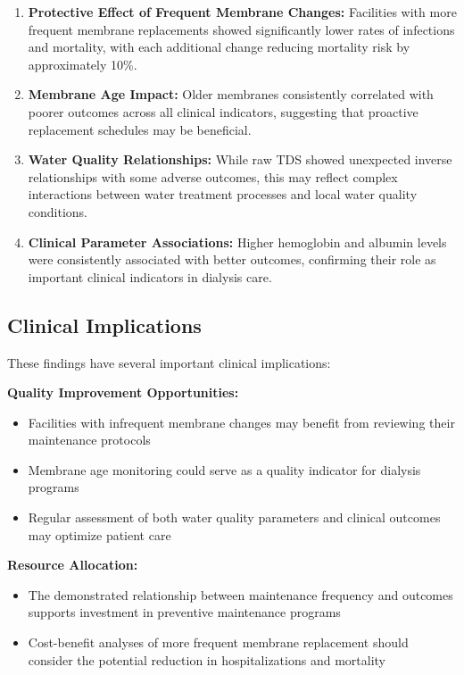 \documentclass[11pt,a4paper]{article}
\begin{document}
\begin{enumerate}
    \item \textbf{Protective Effect of Frequent Membrane Changes:} Facilities with more frequent membrane replacements showed significantly lower rates of infections and mortality, with each additional change reducing mortality risk by approximately 10\%.
    
    \item \textbf{Membrane Age Impact:} Older membranes consistently correlated with poorer outcomes across all clinical indicators, suggesting that proactive replacement schedules may be beneficial.
    
    \item \textbf{Water Quality Relationships:} While raw TDS showed unexpected inverse relationships with some adverse outcomes, this may reflect complex interactions between water treatment processes and local water quality conditions.
    
    \item \textbf{Clinical Parameter Associations:} Higher hemoglobin and albumin levels were consistently associated with better outcomes, confirming their role as important clinical indicators in dialysis care.
\end{enumerate}

\subsection{Clinical Implications}

These findings have several important clinical implications:

\textbf{Quality Improvement Opportunities:}
\begin{itemize}
    \item Facilities with infrequent membrane changes may benefit from reviewing their maintenance protocols
    \item Membrane age monitoring could serve as a quality indicator for dialysis programs
    \item Regular assessment of both water quality parameters and clinical outcomes may optimize patient care
\end{itemize}

\textbf{Resource Allocation:}
\begin{itemize}
    \item The demonstrated relationship between maintenance frequency and outcomes supports investment in preventive maintenance programs
    \item Cost-benefit analyses of more frequent membrane replacement should consider the potential reduction in hospitalizations and mortality
\end{itemize}
\end{document}

